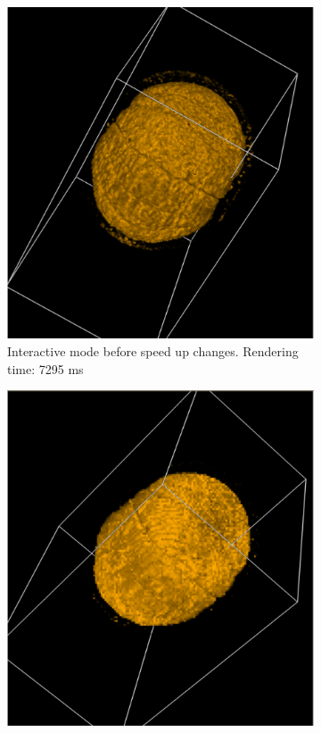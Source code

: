 \documentclass[a4paper]{article}
\begin{document}
\begin{figure}[h]
  \centering
  \begin{subfigure}[b]{0.45\textwidth}
    \centering
    \includegraphics[width=\textwidth]{before-speedup}
    \caption{Interactive mode before speed up changes. Rendering time: 7295 ms }
  \end{subfigure}
  \hfill
  \begin{subfigure}[b]{0.45\textwidth}
    \centering
    \includegraphics[width=\textwidth]{after-speedup}

\end{subfigure}
\end{figure}
\end{document}
